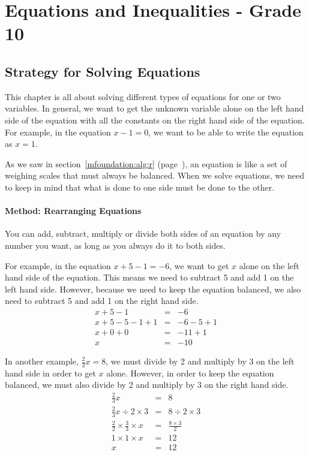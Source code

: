 \documentclass[10pt,a4paper,titlepage,twoside,openright]{report}
\begin{document}




\chapter{Equations and Inequalities - Grade 10}
\label{m:ei:10}


\section{Strategy for Solving Equations}
This chapter is all about solving different types of equations for one or two variables. In general, we want to get the unknown variable alone on the left hand side of the equation with all the constants on the right hand side of the equation. For example, in the equation $x-1=0$, we want to be able to write the equation as $x=1$. 

As we saw in section~\ref{mfoundation:alg:r} (page~\pageref{mfoundation:alg:r}), an equation is like a set of weighing scales that must always be balanced. When we solve equations, we need to keep in mind that what is done to one side must be done to the other. 

\subsubsection{Method: Rearranging Equations}{
You can add, subtract, multiply or divide both  sides of an equation by any number you want, as long as you always do it to both sides.} 

For example, in the equation $x + 5 -1 = -6$, we want to get $x$ alone on the left hand side of the equation. This means we need to subtract 5 and add 1 on the left hand side. However, because we need to keep the equation balanced, we also need to subtract 5 and add 1 on the right hand side.
\begin{eqnarray*}
x + 5 -1 &=& -6 \\
x + 5 -5 -1 +1 &=& -6 -5 +1\\
x + 0+0&=& -11+1\\
x&=& -10
\end{eqnarray*}

In another example, $\frac{2}{3}x=8$, we must divide by 2 and multiply by 3 on the left hand side in order to get $x$ alone. However, in order to keep the equation balanced, we must also divide by 2 and multiply by 3 on the right hand side.
\begin{eqnarray*}
\frac{2}{3}x &=& 8 \\
\frac{2}{3}x \div 2 \times 3 &=& 8 \div 2 \times 3 \\
\frac{2}{2} \times \frac{3}{3} \times x &=& \frac{8\times 3}{2}\\
1 \times 1 \times x &=& 12\\
x &=& 12
\end{eqnarray*}
\end{document}
